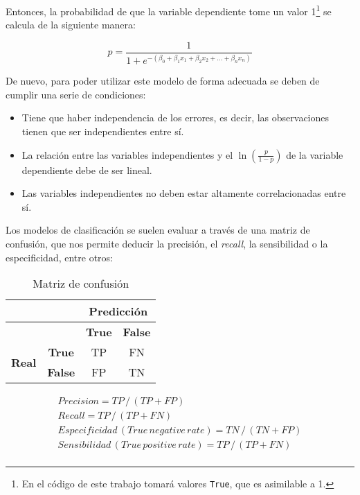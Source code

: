 Entonces, la probabilidad de que la variable dependiente tome un valor 1\footnote{En el código de este trabajo tomará valores \texttt{True}, que es asimilable a 1.} se calcula de la siguiente manera:

\begin{equation}
	p = \frac{1}{1 + e^{-(\beta_{0} + \beta_{1}x_{1} + \beta_{2}x_{2} + \ldots + \beta_{n}x_{n})}}
\end{equation}

De nuevo, para poder utilizar este modelo de forma adecuada se deben de cumplir una serie de condiciones:

\begin{itemize}
\tightlist
\item  
Tiene que haber independencia de los errores, es decir, las observaciones tienen que ser independientes entre sí. 
\item
La relación entre las variables independientes y el $\ln (\frac{p}{1-p})$ de la variable dependiente debe de ser lineal.
\item
Las variables independientes no deben estar altamente correlacionadas entre sí.
\end{itemize}

Los modelos de clasificación se suelen evaluar a través de una matriz de confusión, que nos permite deducir la precisión, el \emph{recall}, la sensibilidad o la especificidad, entre otros:

\begin{table}[ht]
\centering
\begin{tabular}{|c|c|c|c|}
\hline
\multicolumn{2}{|c|}{} & \multicolumn{2}{c|}{\textbf{Predicción}} \\
\hline
\multicolumn{2}{|c|}{} & \textbf{True} & \textbf{False} \\
\hline
\multirow{2}{*}{\textbf{Real}} & \textbf{True} & TP & FN \\
\cline{2-4}
& \textbf{False} & FP & TN \\
\hline
\end{tabular}
\caption{Matriz de confusión}
\end{table}

\begin{align*}
	Precision = TP\, /\, (TP + FP) \\
	Recall = TP\, /\, (TP + FN) \\
	Especificidad\, (True\, negative\, rate) = TN\,/\,(TN+FP) \\
	Sensibilidad\, (True\, positive\, rate) = TP\,/\,(TP+FN) \\
\end{align*}

